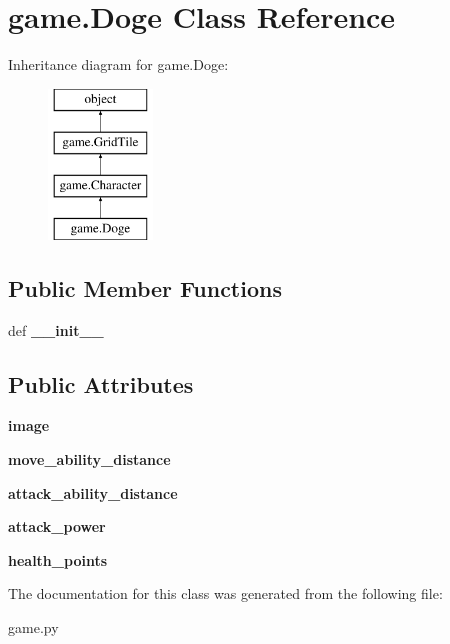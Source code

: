 \hypertarget{classgame_1_1Doge}{\section{game.\-Doge Class Reference}
\label{classgame_1_1Doge}
}
Inheritance diagram for game.\-Doge\-:\begin{figure}[H]
\begin{center}
\leavevmode
\includegraphics[height=4.000000cm]{classgame_1_1Doge}
\end{center}
\end{figure}
\subsection*{Public Member Functions}
\begin{DoxyCompactItemize}
\item 
\hypertarget{classgame_1_1Doge_ac666256c526db182cac3df5ab8279d58}{def {\bfseries \-\_\-\-\_\-init\-\_\-\-\_\-}}\label{classgame_1_1Doge_ac666256c526db182cac3df5ab8279d58}

\end{DoxyCompactItemize}
\subsection*{Public Attributes}
\begin{DoxyCompactItemize}
\item 
\hypertarget{classgame_1_1Doge_a38c30ac4cdc4a80041248a292b070262}{{\bfseries image}}\label{classgame_1_1Doge_a38c30ac4cdc4a80041248a292b070262}

\item 
\hypertarget{classgame_1_1Doge_a855030278537b5c912b93a5957269c8a}{{\bfseries move\-\_\-ability\-\_\-distance}}\label{classgame_1_1Doge_a855030278537b5c912b93a5957269c8a}

\item 
\hypertarget{classgame_1_1Doge_a8881ac6cb9a8f3309cf186fd46e1305d}{{\bfseries attack\-\_\-ability\-\_\-distance}}\label{classgame_1_1Doge_a8881ac6cb9a8f3309cf186fd46e1305d}

\item 
\hypertarget{classgame_1_1Doge_ad8fafec5441315fa4f65ced3c455836e}{{\bfseries attack\-\_\-power}}\label{classgame_1_1Doge_ad8fafec5441315fa4f65ced3c455836e}

\item 
\hypertarget{classgame_1_1Doge_a83a2d9ddb037115733b884050d225ec3}{{\bfseries health\-\_\-points}}\label{classgame_1_1Doge_a83a2d9ddb037115733b884050d225ec3}

\end{DoxyCompactItemize}


The documentation for this class was generated from the following file\-:\begin{DoxyCompactItemize}
\item 
game.\-py\end{DoxyCompactItemize}
